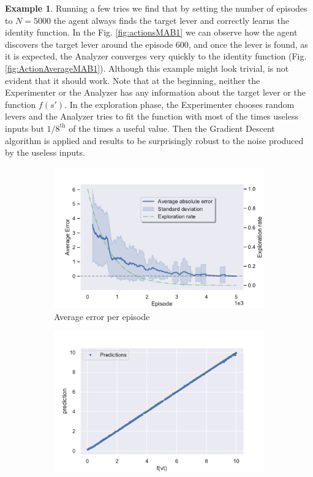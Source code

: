 \documentclass[11pt,a4paper,twoside]{report}
\newcommand{\+}{\textnormal{+} }
\theoremstyle{definition}
\newtheorem{myex}[mythm]{Example}
\numberwithin{equation}{chapter}
\begin{document}
\begin{myex}
    Running a few tries we find that by setting the number of episodes to
    $N=5000$ the agent always finds the target lever and correctly learns the
    identity function. In the Fig. \ref{fig:actionsMAB1} we can observe how the
    agent discovers the target lever around the episode 600, and once the lever
    is found, as it is expected, the Analyzer converges very quickly to the
    identity function (Fig. \ref{fig:ActionAverageMAB1}). Although this example
    might look trivial, is not evident that it should work. Note that at
    the beginning, neither the Experimenter or the Analyzer has any information
    about the target lever or the function $f(s')$. In the exploration phase,
    the Experimenter chooses random levers and the Analyzer tries to fit the
    function with most of the times useless inputs but $1/8^{\text{th}}$ of the
    times a useful value. Then the Gradient Descent algorithm is applied and
    results to be surprisingly robust to the noise produced by the useless inputs.
    \begin{figure}[]
      \centering
      \begin{subfigure}{.5\textwidth}
        \centering
        \includegraphics[width=1\linewidth]{figures/Error-MAB1.pdf}
        \caption{Average error per episode}
        \label{fig:ErrorAverageMAB1}
      \end{subfigure}%
      \begin{subfigure}{.5\textwidth}
        \centering
        \includegraphics[width=1\linewidth]{figures/predictions-MAB1.pdf}

\end{subfigure}
\end{figure}
\end{myex}
\end{document}
